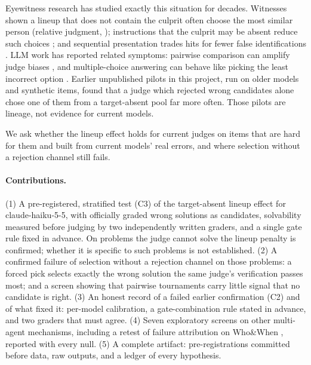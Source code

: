\documentclass[10pt,twocolumn]{article}
\begin{document}
Eyewitness research has studied exactly this situation for decades. Witnesses shown a lineup that does not contain the culprit often choose the most similar person (relative judgment, \citealp{wells1984psychology}); instructions that the culprit may be absent reduce such choices \citep{malpass1981eyewitness}; and sequential presentation trades hits for fewer false identifications \citep{steblay2001eyewitness,steblay2011seventytwo}. LLM work has reported related symptoms: pairwise comparison can amplify judge biases \citep{jeong2025comparative}, and multiple-choice answering can behave like picking the least incorrect option \citep{wang2025llms}. Earlier unpublished pilots in this project, run on older models and synthetic items, found that a judge which rejected wrong candidates alone chose one of them from a target-absent pool far more often. Those pilots are lineage, not evidence for current models.

We ask whether the lineup effect holds for current judges on items that are hard for them and built from current models' real errors, and where selection without a rejection channel still fails.

\paragraph{Contributions.}
(1) A pre-registered, stratified test (C3) of the target-absent lineup effect for claude-haiku-5-5, with officially graded wrong solutions as candidates, solvability measured before judging by two independently written graders, and a single gate rule fixed in advance. On problems the judge cannot solve the lineup penalty is confirmed; whether it is specific to such problems is not established. (2) A confirmed failure of selection without a rejection channel on those problems: a forced pick selects exactly the wrong solution the same judge's verification passes most; and a screen showing that pairwise tournaments carry little signal that no candidate is right. (3) An honest record of a failed earlier confirmation (C2) and of what fixed it: per-model calibration, a gate-combination rule stated in advance, and two graders that must agree. (4) Seven exploratory screens on other multi-agent mechanisms, including a retest of failure attribution on Who\&When \citep{zhang2025which}, reported with every null. (5) A complete artifact: pre-registrations committed before data, raw outputs, and a ledger of every hypothesis.
\end{document}
